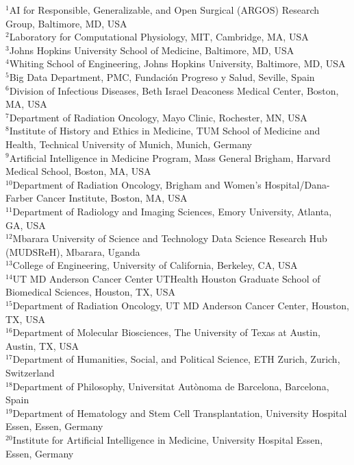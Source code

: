 \documentclass[11pt]{article}
\begin{document}
\begin{center}
{\scriptsize
$^{1}$AI for Responsible, Generalizable, and Open Surgical (ARGOS) Research Group, Baltimore, MD, USA\\
$^{2}$Laboratory for Computational Physiology, MIT, Cambridge, MA, USA\\
$^{3}$Johns Hopkins University School of Medicine, Baltimore, MD, USA\\
$^{4}$Whiting School of Engineering, Johns Hopkins University, Baltimore, MD, USA\\
$^{5}$Big Data Department, PMC, Fundaci\'on Progreso y Salud, Seville, Spain\\
$^{6}$Division of Infectious Diseases, Beth Israel Deaconess Medical Center, Boston, MA, USA\\
$^{7}$Department of Radiation Oncology, Mayo Clinic, Rochester, MN, USA\\
$^{8}$Institute of History and Ethics in Medicine, TUM School of Medicine and Health, Technical University of Munich, Munich, Germany\\
$^{9}$Artificial Intelligence in Medicine Program, Mass General Brigham, Harvard Medical School, Boston, MA, USA\\
$^{10}$Department of Radiation Oncology, Brigham and Women's Hospital/Dana-Farber Cancer Institute, Boston, MA, USA\\
$^{11}$Department of Radiology and Imaging Sciences, Emory University, Atlanta, GA, USA\\
$^{12}$Mbarara University of Science and Technology Data Science Research Hub (MUDSReH), Mbarara, Uganda\\
$^{13}$College of Engineering, University of California, Berkeley, CA, USA\\
$^{14}$UT MD Anderson Cancer Center UTHealth Houston Graduate School of Biomedical Sciences, Houston, TX, USA\\
$^{15}$Department of Radiation Oncology, UT MD Anderson Cancer Center, Houston, TX, USA\\
$^{16}$Department of Molecular Biosciences, The University of Texas at Austin, Austin, TX, USA\\
$^{17}$Department of Humanities, Social, and Political Science, ETH Zurich, Zurich, Switzerland\\
$^{18}$Department of Philosophy, Universitat Aut\`onoma de Barcelona, Barcelona, Spain\\
$^{19}$Department of Hematology and Stem Cell Transplantation, University Hospital Essen, Essen, Germany\\
$^{20}$Institute for Artificial Intelligence in Medicine, University Hospital Essen, Essen, Germany\\
}
\end{center}
\end{document}
